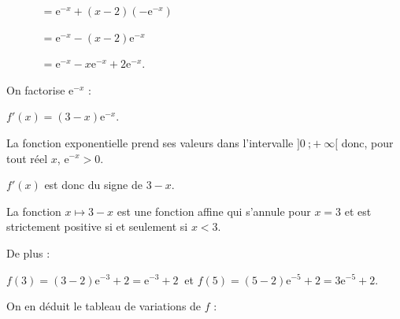 \begin{corrige}
\begin{enumerate}
          \par
          $\phantom{f'(x)}= \text{e}^{-x}+(x-2)(-\text{e}^{-x})$
          \par
          $\phantom{f'(x)}= \text{e}^{-x}-(x-2)\text{e}^{-x}$
          \par
          $\phantom{f'(x)}= \text{e}^{-x}-x\text{e}^{-x} + 2\text{e}^{-x}$.
          \par
          On factorise $\text{e}^{-x}$ :
          \par
          $f'(x)=(3-x)\text{e}^{-x}$.
          \par
          \par
          La fonction exponentielle prend ses valeurs dans l'intervalle $]0~;+~\infty[$ donc, pour tout réel $x$, ${\text{e}^{-x} > 0}$.
          \par
          $f'(x)$ est donc du signe de $3-x$.
          \par
          La fonction $x \longmapsto 3-x$ est une fonction affine qui s'annule pour $x=3$ et est strictement positive si et seulement si $x < 3$.
          \par
          De plus :
          \par
          $f(3)=(3-2)\text{e}^{-3}+2=\text{e}^{-3}+2\ $ et $f(5)=(5-2)\text{e}^{-5}+2=3\text{e}^{-5}+2$.
          \par
          On en déduit le tableau de variations de $f$ :
          \par
          \begin{center}
               \begin{extern}%
\end{extern}
\end{center}
\end{enumerate}
\end{corrige}
